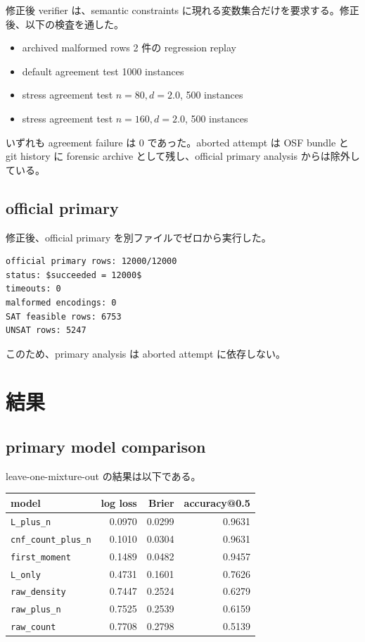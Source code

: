 \documentclass[12pt,a4paper]{article}
\begin{document}
修正後 verifier は、semantic constraints に現れる変数集合だけを要求する。修正後、以下の検査を通した。

\begin{itemize}
\tightlist
\item
  archived malformed rows 2 件の regression replay
\item
  default agreement test 1000 instances
\item
  stress agreement test \(n=80,d=2.0\), 500 instances
\item
  stress agreement test \(n=160,d=2.0\), 500 instances
\end{itemize}

いずれも agreement failure は 0 であった。aborted attempt は OSF bundle と git history に forensic archive として残し、official primary analysis からは除外している。

\subsection{official primary}\label{official-primary}

修正後、official primary を別ファイルでゼロから実行した。

\begin{verbatim}
official primary rows: 12000/12000
status: $succeeded = 12000$
timeouts: 0
malformed encodings: 0
SAT feasible rows: 6753
UNSAT rows: 5247
\end{verbatim}

このため、primary analysis は aborted attempt に依存しない。

\section{結果}\label{ux7d50ux679c}

\subsection{primary model comparison}\label{primary-model-comparison}

leave-one-mixture-out の結果は以下である。

{\def\LTcaptype{table} %
\begin{longtable}[]{@{}lrrr@{}}
\toprule\noalign{}
model & log loss & Brier & accuracy@0.5 \\
\midrule\noalign{}
\endhead
\bottomrule\noalign{}
\endlastfoot
\texttt{L\_plus\_n} & 0.0970 & 0.0299 & 0.9631 \\
\texttt{cnf\_count\_plus\_n} & 0.1010 & 0.0304 & 0.9631 \\
\texttt{first\_moment} & 0.1489 & 0.0482 & 0.9457 \\
\texttt{L\_only} & 0.4731 & 0.1601 & 0.7626 \\
\texttt{raw\_density} & 0.7447 & 0.2524 & 0.6279 \\
\texttt{raw\_plus\_n} & 0.7525 & 0.2539 & 0.6159 \\
\texttt{raw\_count} & 0.7708 & 0.2798 & 0.5139 \\
\end{longtable}
}
\end{document}

